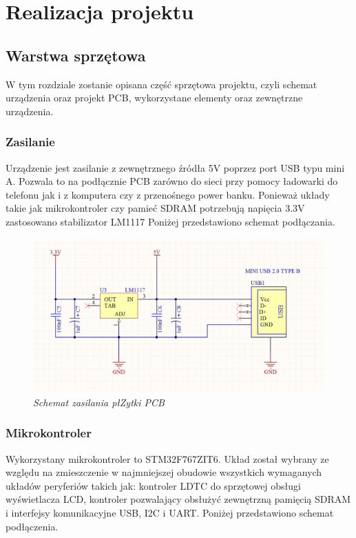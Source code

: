 \documentclass[eng,printmode]{mgr}
\begin{document}
\chapter{ Realizacja projektu }
\section{ Warstwa sprzętowa}
W tym rozdziale zostanie opisana czę\'s\'c sprzętowa projektu, czyli schemat urządzenia oraz projekt PCB, wykorzystane elementy oraz zewnętrzne urządzenia.
\subsection{Zasilanie}
Urządzenie jest zasilanie z zewnętrznego źródła 5V poprzez port USB typu mini A. Pozwala to na podłącznie PCB zarówno do sieci przy pomocy ładowarki do telefonu jak i z komputera czy z przenośnego power banku. Ponieważ układy takie jak mikrokontroler czy pamieć SDRAM potrzebują napięcia 3.3V zastosowano stabilizator LM1117 Poniżej przedstawiono schemat podłączania.

\begin{figure}[!h]
    \centering
    \includegraphics[width=\textwidth]{schematics/power.png}
    \caption{\textit{\scriptsize Schemat zasilania płZytki PCB}}
\end{figure}
\subsection{Mikrokontroler}
Wykorzystany mikrokontroler to STM32F767ZIT6. Układ został wybrany ze względu na zmieszczenie w najmniejszej obudowie wszystkich wymaganych układów peryferiów takich jak: kontroler LDTC do sprzętowej obsługi wyświetlacza LCD, kontroler pozwalający obsłużyć zewnętrzną pamięcią SDRAM i interfejsy komunikacyjne USB, I2C i UART. Poniżej przedstawiono schemat podłączenia.
\end{document}
